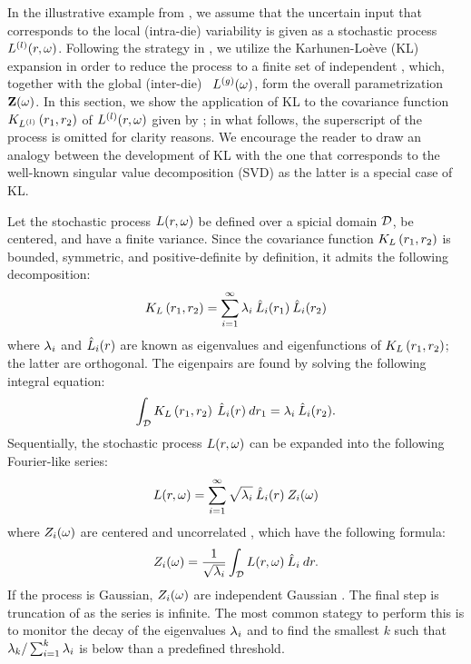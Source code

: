 In the illustrative example from , we assume that the uncertain input that corresponds to the local (intra-die) variability is given as a stochastic process $L^{(l)}(r, \omega)$. Following the strategy in , we utilize the Karhunen-Lo\`{e}ve (KL) expansion in order to reduce the process to a finite set of independent \rvs, which, together with the global (inter-die) \rv\ ${L^{(g)}}(\omega)$, form the overall parametrization $\mathbf{Z}(\omega)$. In this section, we show the application of KL to the covariance function $K_{L^{(l)}}\left(r_1, r_2\right)$ of $L^{(l)}(r, \omega)$ given by  \cite{maitre2010, ghanem1991, ghanta2006}; in what follows, the superscript of the process is omitted for clarity reasons. We encourage the reader to draw an analogy between the development of KL with the one that corresponds to the well-known singular value decomposition (SVD) as the latter is a special case of KL.

Let the stochastic process $L(r, \omega)$ be defined over a spicial domain $\mathcal{D}$, be centered, and have a finite variance. Since the covariance function $K_{L}\left(r_1, r_2\right)$ is bounded, symmetric, and positive-definite by definition, it admits the following decomposition:
\[
  K_{L}\left(r_1, r_2\right) = \sum_{i = 1}^\infty \lambda_i \: \hat{L}_i(r_1) \: \hat{L}_i(r_2)
\]
where $\lambda_i$ and $\hat{L}_i(r)$ are known as eigenvalues and eigenfunctions of $K_{L}\left(r_1, r_2\right)$; the latter are orthogonal. The eigenpairs are found by solving the following integral equation:
\begin{equation} \elabel{kl-eigenpairs}
  \int_\domain \fCov{\Leff}{r_1, r_2} \: \klf{\Leff}_i (r) \: dr_1 = \klv_i \: \klf{\Leff}_i(r_2).
\end{equation}
Sequentially, the stochastic process $L(r, \omega)$ can be expanded into the following Fourier-like series:
\begin{equation} \elabel{kl-expansion}
  \Leff(r, \o) = \sum_{i = 1}^\infty \sqrt{\lambda_i} \: \pcc{\Leff}_i(r) \: \Z_i(\o)
\end{equation}
where $Z_i(\omega)$ are centered and uncorrelated \rvs, which have the following formula:
\[
  Z_i(\omega) = \frac{1}{\sqrt{\lambda_i}} \int_{\mathcal{D}} L(r, \omega) \: \hat{L}_i \: dr.
\]
If the process is Gaussian, $Z_i(\omega)$ are independent Gaussian \rvs. The final step is truncation of  as the series is infinite. The most common stategy to perform this is to monitor the decay of the eigenvalues $\lambda_i$ and to find the smallest $k$ such that $\lambda_k / \sum_{i = 1}^k \lambda_i$ is below than a predefined threshold.

